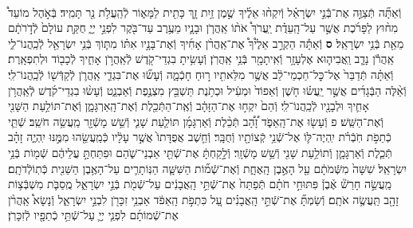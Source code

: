 \documentclass[twoside, openany, parskip=half, 11pt]{book}
\begin{document}
\begin{sometimes}
\begin{footnotesize}
\begin{multicols}{2}
\\
וְֿאַתָּ֞ה תְּֿצַוֶּ֣ה אֶת־בְּֿֿנֵ֣י יִשְׂרָאֵ֗ל וְֿיִקְח֨וּ אֵלֶ֜יךָ שֶׁ֣מֶן זַ֥יִת זָ֛ךְ כָּתִ֖ית לַמָּא֑וֹר לְֿהַֽעֲלֹ֥ת נֵ֖ר תָּמִֽיד׃ בְּֿאֹ֣הֶל מוֹעֵד֩ מִח֨וּץ לַפָּרֹ֜כֶת אֲשֶׁ֣ר עַל־הָֽעֵדֻ֗ת יַֽעֲרֹךְ֩ אֹת֨וֹ אַֽהֲרֹ֧ן וּבָנָ֛יו מֵעֶ֥רֶב עַד־בֹּ֖קֶר לִפְנֵ֣י יְיָ֑ חֻקַּ֤ת עוֹלָם֙ לְֿדֹ֣רֹתָ֔ם מֵאֵ֖ת בְּֿנֵ֥י יִשְׂרָאֵֽל׃ \textbf{ס} וְֿאַתָּ֡ה הַקְרֵ֣ב אֵלֶ֩יךָ֩ אֶת־אַֽהֲרֹ֨ן אָחִ֜יךָ וְֿאֶת־בָּנָ֣יו אִתּ֗וֹ מִתּ֛וֹךְ בְּֿנֵ֥י יִשְׂרָאֵ֖ל לְֿכַֽהֲנוֹ־לִ֑י אַֽהֲרֹ֕ן נָדָ֧ב וַֽאֲבִיה֛וּא אֶלְעָזָ֥ר וְֿאִֽיתָמָ֖ר בְּֿנֵ֥י אַֽהֲרֹֽן׃ וְֿעָשִׂ֥יתָ בִגְדֵי־קֹ֖דֶשׁ לְֿאַֽהֲרֹ֣ן אָחִ֑יךָ לְֿכָב֖וֹד וּלְתִפְאָֽרֶת׃
וְֿאַתָּ֗ה תְּֿדַבֵּר֙ אֶל־כׇּל־חַכְמֵי־לֵ֔ב אֲשֶׁ֥ר מִלֵּאתִ֖יו ר֣וּחַ חָכְֿמָ֑ה וְֿעָשׂ֞וּ אֶת־בִּגְדֵ֧י אַֽהֲרֹ֛ן לְֿקַדְּֿשׁ֖וֹ לְֿכַֽהֲנוֹ־לִֽי׃ וְֿאֵ֨לֶּה הַבְּֿגָדִ֜ים אֲשֶׁ֣ר יַֽעֲשׂ֗וּ חֹ֤שֶׁן וְֿאֵפוֹד֙ וּמְעִ֔יל וּכְתֹ֥נֶת תַּשְׁבֵּ֖ץ מִצְנֶ֣פֶת וְֿאַבְנֵ֑ט וְֿעָשׂ֨וּ בִגְדֵי־קֹ֜דֶשׁ לְֿאַֽהֲרֹ֥ן אָחִ֛יךָ וּלְבָנָ֖יו לְֿכַֽהֲנוֹ־לִֽי׃ וְֿהֵם֙ יִקְח֣וּ אֶת־הַזָּהָ֔ב וְֿאֶֽת־הַתְּֿכֵ֖לֶת וְֿאֶת־הָֽאַרְגָּמָ֑ן וְֿאֶת־תּוֹלַ֥עַת הַשָּׁנִ֖י וְֿאֶת־הַשֵּֽׁשׁ׃ פ
וְֿעָשׂ֖וּ אֶת־הָֽאֵפֹ֑ד זָ֠הָ֠ב תְּֿכֵ֨לֶת וְֿאַרְגָּמָ֜ן תּוֹלַ֧עַת שָׁנִ֛י וְֿשֵׁ֥שׁ מָשְֿׁזָ֖ר מַֽעֲשֵׂ֥ה חֹשֵֽׁב׃ שְֿׁתֵּ֧י כְֿתֵפֹ֣ת חֹֽבְֿרֹ֗ת יִֽהְיֶה־לּ֛וֹ אֶל־שְֿׁנֵ֥י קְֿצוֹתָ֖יו וְֿחֻבָּֽר׃ וְֿחֵ֤שֶׁב אֲפֻדָּתוֹ֙ אֲשֶׁ֣ר עָלָ֔יו כְּֿמַֽעֲשֵׂ֖הוּ מִמֶּ֣נּוּ יִֽהְיֶ֑ה זָהָ֗ב תְּֿכֵ֧לֶת וְֿאַרְגָּמָ֛ן וְֿתוֹלַ֥עַת שָׁנִ֖י וְֿשֵׁ֥שׁ מָשְֿׁזָֽר׃ וְֿלָ֣קַחְתָּ֔ אֶת־שְֿׁתֵּ֖י אַבְנֵי־שֹׁ֑הַם וּפִתַּחְתָּ֣ עֲלֵיהֶ֔ם שְֿׁמ֖וֹת בְּֿנֵ֥י יִשְׂרָאֵֽל׃
שִׁשָּׁה֙ מִשְּֿׁמֹתָ֔ם עַ֖ל הָאֶ֣בֶן הָֽאֶחָ֑ת וְֿאֶת־שְֿׁמ֞וֹת הַשִּׁשָּׁ֧ה הַנּֽוֹתָרִ֛ים עַל־הָאֶ֥בֶן הַשֵּׁנִ֖ית כְּֿתֽוֹלְֿדֹתָֽם׃ מַֽעֲשֵׂ֣ה חָרַשׁ֘ אֶ֒בֶן֒ פִּתּוּחֵ֣י חֹתָ֗ם תְּֿפַתַּח֙ אֶת־שְֿׁתֵּ֣י הָֽאֲבָנִ֔ים עַל־שְֿׁמֹ֖ת בְּֿנֵ֣י יִשְׂרָאֵ֑ל מֻֽסַבֹּ֛ת מִשְׁבְּֿצ֥וֹת זָהָ֖ב תַּֽעֲשֶׂ֥ה אֹתָֽם׃ וְֿשַׂמְתָּ֞ אֶת־שְֿׁתֵּ֣י הָֽאֲבָנִ֗ים עַ֚ל כִּתְפֹ֣ת הָֽאֵפֹ֔ד אַבְנֵ֥י זִכָּרֹ֖ן לִבְנֵ֣י יִשְׂרָאֵ֑ל וְֿנָשָׂא֩ אַֽהֲרֹ֨ן אֶת־שְֿׁמוֹתָ֜ם לִפְנֵ֧י יְיָ֛ עַל־שְֿׁתֵּ֥י כְֿתֵפָ֖יו לְֿזִכָּרֹֽן׃


\end{multicols}
\end{footnotesize}
\end{sometimes}
\end{document}
